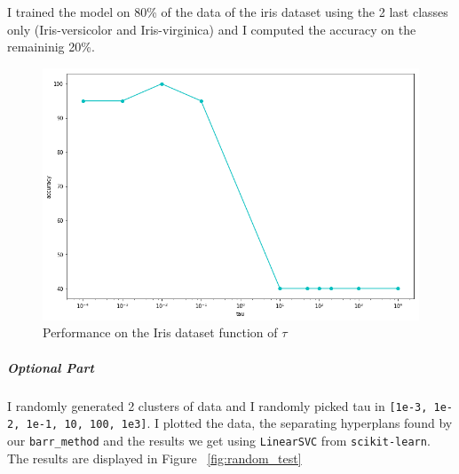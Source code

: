 \documentclass[11pt]{article}
\numberwithin{figure}{section} %
\begin{document}
I trained the model on 80\% of the data of the iris dataset using the 2 last classes only (Iris-versicolor and Iris-virginica) and I computed the accuracy on the remaininig 20\%.
\begin{figure}[H] 
	\centering
	\includegraphics[width=\textwidth]{images/tau_versus_acc.png}
	\caption{Performance on the Iris dataset function of $\tau$}
	\label{fig:variation_tau}
\end{figure}

\subparagraph{Optional Part}
I randomly generated 2 clusters of data and I randomly picked tau in \texttt{[1e-3, 1e-2, 1e-1, 10, 100, 1e3]}. I plotted the data, the separating hyperplans found by our \texttt{barr\_method}
and the results we get using \texttt{LinearSVC} from \texttt{scikit-learn}. The results are displayed in Figure ~\ref{fig:random_test}
\end{document}
